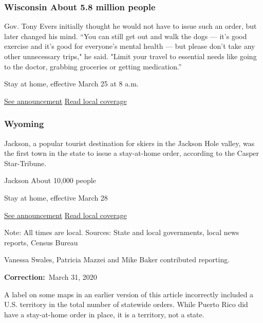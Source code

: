 \hypertarget{wisconsin-about-58-million-people}{%
\subsubsection{Wisconsin About 5.8 million
people}\label{wisconsin-about-58-million-people}}

Gov. Tony Evers initially thought he would not have to issue such an
order, but later changed his mind. ``You can still get out and walk the
dogs --- it's good exercise and it's good for everyone's mental health
--- but please don't take any other unnecessary trips," he said. "Limit
your travel to essential needs like going to the doctor, grabbing
groceries or getting medication.''

Stay at home, effective March 25 at 8 a.m.

\href{https://www.wpr.org/sites/default/files/health_order_12_safer_at_home.pdf}{See
announcement} \textbar{}
\href{https://www.wpr.org/evers-administration-issues-stay-home-order-wisconsin}{Read
local coverage}

\hypertarget{wyoming}{%
\subsubsection{Wyoming}\label{wyoming}}

Jackson, a popular tourist destination for skiers in the Jackson Hole
valley, was the first town in the state to issue a stay-at-home order,
according to the Casper Star-Tribune.

Jackson About 10,000 people

Stay at home, effective March 28

\href{https://www.jacksonwy.gov/DocumentCenter/View/3048/Mar28-EmOrd1249-StayAtHomeOrder?bidId=}{See
announcement} \textbar{}
\href{https://trib.com/news/local/casper/jackson-issues-shelter-in-place-order-to-limit-spread-of/article_40c9fa29-c59b-540f-b4cd-7b211b6eb335.html}{Read
local coverage}

Note: All times are local. Sources: State and local governments, local
news reports, Census Bureau

Vanessa Swales, Patricia Mazzei and Mike Baker contributed reporting.

\textbf{Correction:}~March 31, 2020

A label on some maps in an earlier version of this article incorrectly
included a U.S. territory in the total number of statewide orders. While
Puerto Rico did have a stay-at-home order in place, it is a territory,
not a state.

